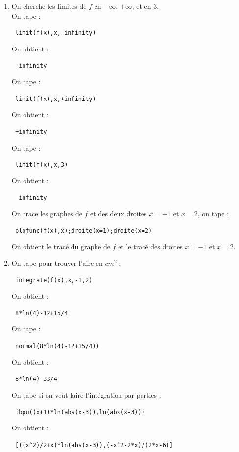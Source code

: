 \documentclass{article}
\begin{document}
\begin{giacjshere}
\begin{enumerate}
Donc  $f'(x)>0$ si $x \in\ ]-\infty;\alpha[\  \cup \ ]3;+\infty[\ $ 
et $f'(x)<0$ si $x \in\ ]\alpha;3[$.\\
Donc $f$ est croissante sur $\ ]-\infty;\alpha[\   \cup \ ]3;+\infty[\ $ et 
est d\'ecroissante sur $\ ]\alpha;3[$.
\item 
On cherche les limites de $f$ en $-\infty$, $+\infty$, et en $3$.\\
On tape :
\begin{center}
\verb| limit(f(x),x,-infinity)|
\end{center}
On obtient :
\begin{center}
\verb| -infinity|
\end{center}
On tape :
\begin{center}
\verb| limit(f(x),x,+infinity)|
\end{center}
On obtient :
\begin{center}
\verb| +infinity|
\end{center}
On tape :
\begin{center}
\verb| limit(f(x),x,3)|
\end{center}
On obtient :
\begin{center}
\verb| -infinity|
\end{center}
On trace les graphes de $f$ et des deux droites $x=-1$ et $ x=2$, on tape :
\begin{center}
\verb| plofunc(f(x),x);droite(x=1);droite(x=2)|
\end{center}
On obtient le trac\'e du graphe de $f$ et le trac\'e des droites
$x=-1$ et $x=2$.
\item 
On tape pour trouver l'aire en $cm^2$ :
\begin{center}
\verb| integrate(f(x),x,-1,2)|
\end{center}
On obtient :
\begin{center}
\verb| 8*ln(4)-12+15/4|
\end{center}
On tape :
\begin{center}
\verb| normal(8*ln(4)-12+15/4))|
\end{center}
On obtient :
\begin{center}
\verb| 8*ln(4)-33/4|
\end{center}
On tape si on veut faire l'int\'egration par parties :
\begin{center}
\verb| ibpu((x+1)*ln(abs(x-3)),ln(abs(x-3)))|
\end{center}
On obtient :
\begin{center}
\verb| [((x^2)/2+x)*ln(abs(x-3)),(-x^2-2*x)/(2*x-6)]|
\end{center}

\end{enumerate}
\end{giacjshere}
\end{document}
